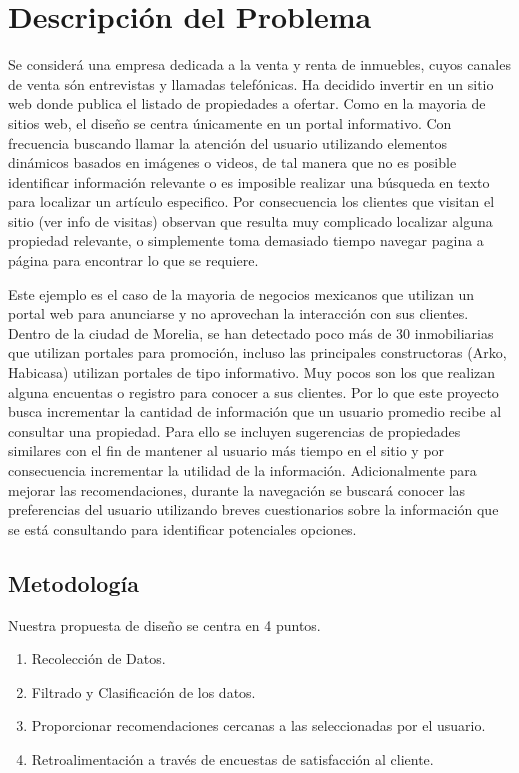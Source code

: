 \section{Descripción del Problema}\label{descripciuxf3n-del-problema}

Se considerá una empresa dedicada a la venta y renta de inmuebles, cuyos canales  de venta són  entrevistas y  llamadas telefónicas. Ha decidido invertir en un sitio web donde publica el listado de propiedades a ofertar. Como en la mayoria de sitios web, el diseño se centra únicamente en un portal informativo. Con frecuencia buscando llamar la atención del usuario utilizando elementos dinámicos basados en imágenes o videos,  de tal manera que no es posible identificar información relevante o es imposible realizar una búsqueda en texto para localizar un artículo especifico. Por consecuencia los clientes que visitan el sitio (ver info de visitas) observan que resulta muy complicado localizar alguna propiedad relevante, o simplemente toma demasiado tiempo navegar pagina a página para encontrar lo que se requiere. 

Este ejemplo es el caso de la mayoria de negocios mexicanos que utilizan un portal web para anunciarse y no aprovechan la interacción con sus clientes.
Dentro de la ciudad de Morelia, se han detectado poco más de 30 inmobiliarias que utilizan portales para promoción, incluso las principales constructoras (Arko, Habicasa) utilizan  portales de tipo informativo. Muy pocos son los que realizan alguna encuentas o registro para conocer a sus clientes. Por lo que este proyecto busca incrementar la cantidad de información que un usuario promedio recibe al consultar una propiedad. Para ello se incluyen sugerencias de propiedades similares con el fin de mantener al usuario más tiempo en el sitio y por consecuencia incrementar la utilidad de la información. Adicionalmente para mejorar las recomendaciones, durante la navegación se buscará conocer las preferencias del usuario utilizando  breves cuestionarios sobre la información que se está consultando para identificar potenciales opciones. 

\subsection{Metodología}

Nuestra propuesta de diseño se centra en 4 puntos.
\begin{enumerate}
\item Recolección de Datos.
\item Filtrado y Clasificación de los datos.
\item Proporcionar recomendaciones cercanas a las seleccionadas por el usuario.
\item Retroalimentación a través de encuestas de satisfacción al cliente.
\end{enumerate}


